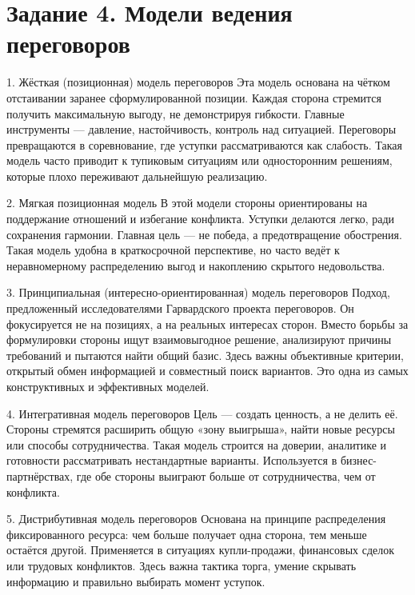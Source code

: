 \documentclass[14pt,a4paper]{extarticle}
\begin{document}
\section{Задание 4. Модели ведения переговоров}
\begin{sloppypar}
1. Жёсткая (позиционная) модель переговоров Эта модель основана на чётком
    отстаивании заранее сформулированной позиции. Каждая сторона стремится
    получить максимальную выгоду, не демонстрируя гибкости. Главные инструменты
    — давление, настойчивость, контроль над ситуацией. Переговоры превращаются
    в соревнование, где уступки рассматриваются как слабость. Такая модель
    часто приводит к тупиковым ситуациям или односторонним решениям, которые
    плохо переживают дальнейшую реализацию.

    2. Мягкая позиционная модель В этой модели стороны ориентированы на
    поддержание отношений и избегание конфликта. Уступки делаются легко, ради
    сохранения гармонии. Главная цель — не победа, а предотвращение обострения.
    Такая модель удобна в краткосрочной перспективе, но часто ведёт к
    неравномерному распределению выгод и накоплению скрытого недовольства.

    3. Принципиальная (интересно-ориентированная) модель переговоров Подход,
    предложенный исследователями Гарвардского проекта переговоров. Он
    фокусируется не на позициях, а на реальных интересах сторон. Вместо борьбы
    за формулировки стороны ищут взаимовыгодное решение, анализируют причины
    требований и пытаются найти общий базис. Здесь важны объективные критерии,
    открытый обмен информацией и совместный поиск вариантов. Это одна из самых
    конструктивных и эффективных моделей.

    4. Интегративная модель переговоров Цель — создать ценность, а не делить
    её. Стороны стремятся расширить общую «зону выигрыша», найти новые ресурсы
    или способы сотрудничества. Такая модель строится на доверии, аналитике и
    готовности рассматривать нестандартные варианты. Используется в
    бизнес-партнёрствах, где обе стороны выиграют больше от сотрудничества, чем
    от конфликта.

    5. Дистрибутивная модель переговоров Основана на принципе распределения
    фиксированного ресурса: чем больше получает одна сторона, тем меньше
    остаётся другой. Применяется в ситуациях купли-продажи, финансовых сделок
    или трудовых конфликтов. Здесь важна тактика торга, умение скрывать
    информацию и правильно выбирать момент уступок.


\end{sloppypar}
\end{document}
